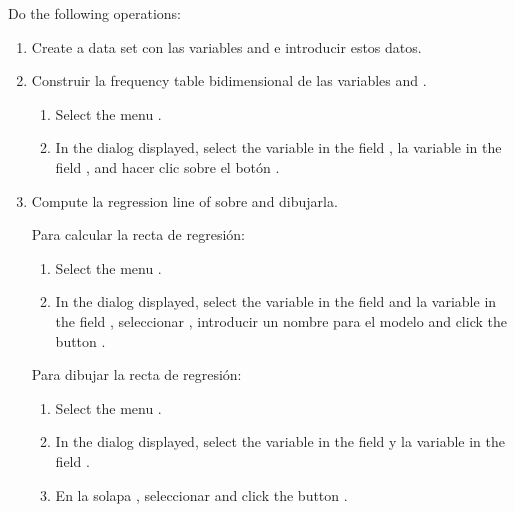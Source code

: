 \begin{enumerate}[leftmargin=*]
Do the following operations:
\begin{enumerate}
\item  Create a data set con las variables  and  e introducir estos
datos.

\item Construir la frequency table bidimensional de las variables  and . 
\begin{indication}
\begin{enumerate}
\item Select the menu .
\item In the dialog displayed, select the variable  in the field , la variable  in the field , and hacer clic
sobre el botón . 
\end{enumerate}
\end{indication}

\item  Compute la regression line of  sobre  and dibujarla.
\begin{indication}
Para calcular la recta de regresión:
\begin{enumerate}
\item Select the menu .
\item In the dialog displayed, select the variable  in the field  and la variable  in the field , seleccionar
, introducir un nombre para el modelo and click the button .
\end{enumerate}
Para dibujar la recta de regresión:
\begin{enumerate}
\item Select the menu .
\item In the dialog displayed, select the variable  in the field  y
la variable  in the field .
\item En la solapa , seleccionar  and click the button
.
\end{enumerate}
\end{indication}


\end{enumerate}
\end{enumerate}
